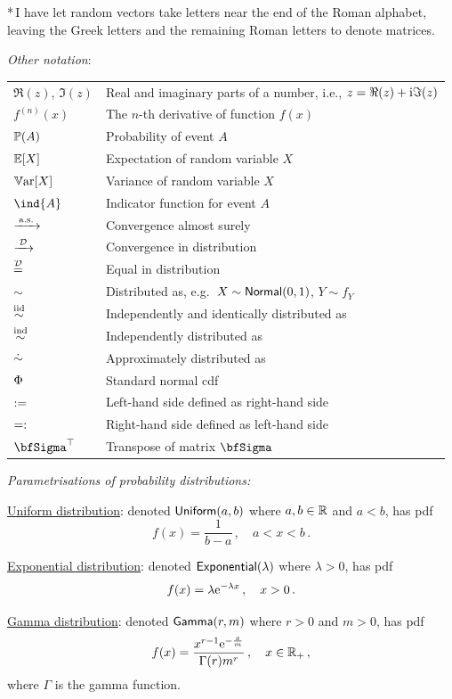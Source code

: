 *\,I have let random vectors take letters near the end of the Roman alphabet, leaving the Greek letters and the remaining Roman letters to denote matrices.


\emph{Other notation}:

\begin{tabular}{ll}
$\Re(z)$, $\Im(z)$ & Real and imaginary parts of a number, i.e., $z = \Re(z) + \mathrm{i} \Im(z)$ \\
$f^{(n)}(x)$ & The $n$-th derivative of function $f(x)$ \\
$\operatorname{{\mathbb P}}(A)$ & Probability of event $A$ \\
$\operatorname{{\mathbb E}}[X]$ & Expectation of random variable $X$ \\
$\operatorname{\mathbb{V}\mathrm{ar}}[X]$ & Variance of random variable $X$ \\
$\ind{A}$ & Indicator function for event $A$ \\
$\xrightarrow{\:\smash{\mathrm{a.s.}}\:}$ & Convergence almost surely \\
$\xrightarrow{\:\smash{\mathcal{D}}\:}$ &  Convergence in distribution \\
$\stackrel{\smash{\mathcal{D}}}{=}$ & Equal in distribution \\
$\sim$ & Distributed as, e.g.\ $X \sim \mathsf{Normal}(0,1)$, $Y \sim f_Y$ \\
$\overset{\smash{\mathrm{iid}}}{\sim}$ & Independently and identically distributed as \\
$\overset{\smash{\mathrm{ind}}}{\sim}$ & Independently distributed as \\
$\mathrel{\dot\sim}$ & Approximately distributed as \\
$\mathrm{\Phi}$ & Standard normal cdf \\
$:=$ & Left-hand side defined as right-hand side \\
$=:$ & Right-hand side defined as left-hand side \\
$\bfSigma^{\tr}$ & Transpose of matrix $\bfSigma$
\end{tabular}

\emph{Parametrisations of probability distributions:}

\underline{Uniform distribution}: denoted $\mathsf{Uniform}(a,b)$ where $a,b\in\mathbb{R}$ and $a < b$, has pdf
\[ f(x) = \frac{1}{b-a} \,, \quad  a < x < b \,. \]

\underline{Exponential distribution}: denoted $\mathsf{Exponential}(\lambda)$ where $\lambda > 0$, has pdf
\[ f(x) = \lambda \mathrm{e}^{-\lambda x} \,, \quad x > 0 \,. \]

\underline{Gamma distribution}: denoted $\mathsf{Gamma}(r,m)$ where $r > 0$ and $m > 0$, has pdf
\[ f(x) = \frac{x^{r-1}\mathrm{e}^{-\frac{x}{m}}}{\Gamma(r)m^{r}} \,, \quad x \in \mathbb{R}_+\,,\]
where $\Gamma$ is the gamma function.

